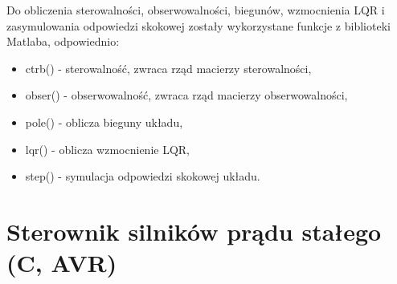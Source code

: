 \documentclass[a4paper,12pt,twoside,openany]{report}
\begin{document}
Do obliczenia sterowalności, obserwowalności, biegunów, wzmocnienia LQR i zasymulowania odpowiedzi skokowej zostały wykorzystane funkcje z biblioteki Matlaba, odpowiednio:
\begin{itemize}
\item ctrb() - sterowalność, zwraca rząd macierzy sterowalności,
\item obser() - obserwowalność, zwraca rząd macierzy obserwowalności,
\item pole() - oblicza bieguny układu,
\item lqr() - oblicza wzmocnienie LQR,
\item step() - symulacja odpowiedzi skokowej układu.
\end{itemize}

\section{Sterownik silników prądu stałego (C, AVR)}
\end{document}
